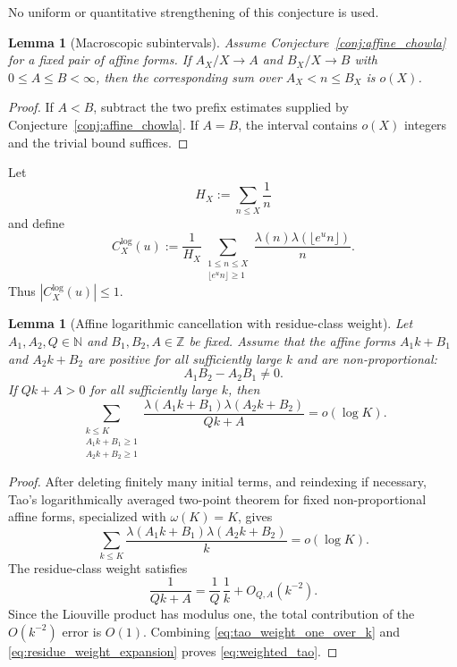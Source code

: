 \documentclass[preprint,12pt]{elsarticle}
\numberwithin{equation}{section}
\theoremstyle{plain}
\newtheorem{lemma}[theorem]{Lemma}
\theoremstyle{definition}
\theoremstyle{remark}
\begin{document}
No uniform or quantitative strengthening of this conjecture is used.

\begin{lemma}[Macroscopic subintervals]
\label{lem:macroscopic}
Assume Conjecture~\ref{conj:affine_chowla} for a fixed pair of affine forms.
If $A_X/X\to A$ and $B_X/X\to B$ with $0\le A\le B<\infty$, then the
corresponding sum over $A_X<n\le B_X$ is $o(X)$.
\end{lemma}

\begin{proof}
If $A<B$, subtract the two prefix estimates supplied by
Conjecture~\ref{conj:affine_chowla}. If $A=B$, the interval contains $o(X)$
integers and the trivial bound suffices.
\end{proof}

Let
\[
H_X:=\sum_{n\le X}\frac1n
\]
and define
\begin{equation}
C_X^{\log}(u):=
\frac1{H_X}
\sum_{\substack{1\le n\le X\\ \lfloor e^u n\rfloor\ge1}}
\frac{\lambda(n)\lambda(\lfloor e^u n\rfloor)}n.
\label{eq:logdef}
\end{equation}
Thus $|C_X^{\log}(u)|\le1$.

\begin{lemma}[Affine logarithmic cancellation with residue-class weight]
\label{lem:weighted_tao}
Let $A_1,A_2,Q\in\mathbb N$ and $B_1,B_2,A\in\mathbb Z$ be fixed.
Assume that the affine forms $A_1k+B_1$ and $A_2k+B_2$ are positive for all
sufficiently large $k$ and are non-proportional:
\begin{equation}
A_1B_2-A_2B_1\ne0.
\label{eq:weighted_tao_nonprop}
\end{equation}
If $Qk+A>0$ for all sufficiently large $k$, then
\begin{equation}
\sum_{\substack{k\le K\\A_1k+B_1\ge1\\A_2k+B_2\ge1}}
\frac{\lambda(A_1k+B_1)\lambda(A_2k+B_2)}{Qk+A}
=o(\log K).
\label{eq:weighted_tao}
\end{equation}
\end{lemma}

\begin{proof}
After deleting finitely many initial terms, and reindexing if necessary,
Tao's logarithmically averaged two-point theorem for fixed non-proportional
affine forms, specialized with $\omega(K)=K$, gives
\begin{equation}
\sum_{k\le K}
\frac{\lambda(A_1k+B_1)\lambda(A_2k+B_2)}{k}
=o(\log K).
\label{eq:tao_weight_one_over_k}
\end{equation}
The residue-class weight satisfies
\begin{equation}
\frac1{Qk+A}=\frac1Q\,\frac1k+O_{Q,A}(k^{-2}).
\label{eq:residue_weight_expansion}
\end{equation}
Since the Liouville product has modulus one, the total contribution of the
$O(k^{-2})$ error is $O(1)$. Combining
\eqref{eq:tao_weight_one_over_k} and
\eqref{eq:residue_weight_expansion} proves \eqref{eq:weighted_tao}.
\end{proof}
\end{document}

